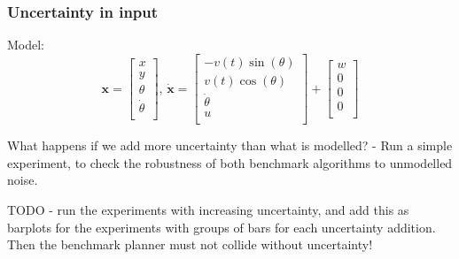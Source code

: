 \subsubsection{Uncertainty in input}
Model:
\begin{equation}
  \label{eq:model-dynamics-experiments}
  \mathbf{x} =
  \begin{bmatrix}
    x \\ y \\ \theta \\ \dot{\theta} \\
  \end{bmatrix}, \, \dot{\mathbf{x}} =
  \begin{bmatrix}
    -v(t)   \sin(\theta) \\
    v(t) \cos(\theta) \\
    \dot{\theta} \\
    u \\
  \end{bmatrix}
  +
  \begin{bmatrix}
    w \\
    0 \\
    0 \\
    0 \\
  \end{bmatrix}
\end{equation}

What happens if we add more uncertainty than what is modelled? - Run a simple
experiment, to check the robustness of both benchmark algorithms to unmodelled
noise.

TODO - run the experiments with increasing uncertainty, and add this as barplots
for the experiments with groups of bars for each uncertainty addition. Then the
benchmark planner must not collide without uncertainty!


